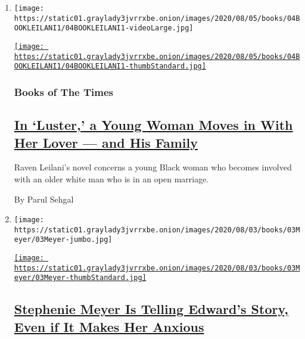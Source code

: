 \begin{enumerate}
\def\labelenumi{\arabic{enumi}.}
\item
  \texttt{[image: https://static01.graylady3jvrrxbe.onion/images/2020/08/05/books/04BOOKLEILANI1/04BOOKLEILANI1-videoLarge.jpg]}

  \href{/2020/08/04/books/review-luster-raven-leilani.html}{\texttt{[image: https://static01.graylady3jvrrxbe.onion/images/2020/08/05/books/04BOOKLEILANI1/04BOOKLEILANI1-thumbStandard.jpg]}}

  \hypertarget{books-of-the-times}{%
  \subsubsection{Books of The Times}\label{books-of-the-times}}

  \hypertarget{in-luster-a-young-woman-moves-in-with-her-lover--and-his-family}{%
  \subsection{\texorpdfstring{\href{/2020/08/04/books/review-luster-raven-leilani.html}{In
  `Luster,' a Young Woman Moves in With Her Lover --- and His
  Family}}{In `Luster,' a Young Woman Moves in With Her Lover --- and His Family}}\label{in-luster-a-young-woman-moves-in-with-her-lover--and-his-family}}

  Raven Leilani's novel concerns a young Black woman who becomes
  involved with an older white man who is in an open marriage.

  By Parul Sehgal
\item
  \texttt{[image: https://static01.graylady3jvrrxbe.onion/images/2020/08/03/books/03Meyer/03Meyer-jumbo.jpg]}

  \href{/2020/08/03/books/midnight-sun-stephenie-meyer-twilight.html}{\texttt{[image: https://static01.graylady3jvrrxbe.onion/images/2020/08/03/books/03Meyer/03Meyer-thumbStandard.jpg]}}

  \hypertarget{stephenie-meyer-is-telling-edwards-story-even-if-it-makes-her-anxious}{%
  \subsection{\texorpdfstring{\href{/2020/08/03/books/midnight-sun-stephenie-meyer-twilight.html}{Stephenie
  Meyer Is Telling Edward's Story, Even if It Makes Her
  Anxious}}{Stephenie Meyer Is Telling Edward's Story, Even if It Makes Her Anxious}}\label{stephenie-meyer-is-telling-edwards-story-even-if-it-makes-her-anxious}}


\end{enumerate}
